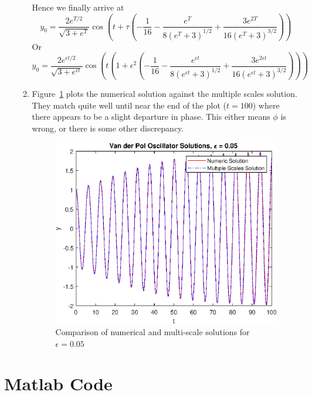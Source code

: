 \documentclass{X:/Documents/Coding/Latex/myassignment}
\begin{document}
\begin{enumerate}
\begin{enumerate}
	Hence we finally arrive at
	 \[ y_0 = \frac{2e^{T/2}}{\sqrt{3 + e^{T}}}\cos\left(t+\tau \left(-\frac{1}{16} - \frac{e^T}{8(e^T+3)^{1/2}} + \frac{3e^{2T}}{16(e^{T}+3)^{3/2}}\right)\right)\]
	 Or 
	 \[ y_0 = \frac{2e^{\epsilon t/2}}{\sqrt{3 + e^{\epsilon t}}}\cos\left(t\left(1+\epsilon^2  \left(-\frac{1}{16} - \frac{e^{\epsilon t}}{8(e^{\epsilon t}+3)^{1/2}} + \frac{3e^{2\epsilon t}}{16(e^{\epsilon t}+3)^{3/2}}\right)\right)\right)\]
		\item %

		Figure~\ref{fig:q2} plots the numerical solution against the multiple scales solution. They match quite well until near the end of the plot ($t=100$) where there appears to be a slight departure in phase. This either means $\phi$ is wrong, or there is some other discrepancy. 
	\begin{figure}[h]
		\centering
		\label{fig:q2}
		\includegraphics[width=0.8\linewidth]{TopicCA4Q2.eps}
		\caption{Comparison of numerical and multi-scale solutions for $\epsilon = 0.05$}
	\end{figure}

	\end{enumerate}
\end{enumerate}	

\clearpage












\section*{Matlab Code}


\clearpage

\end{document}
